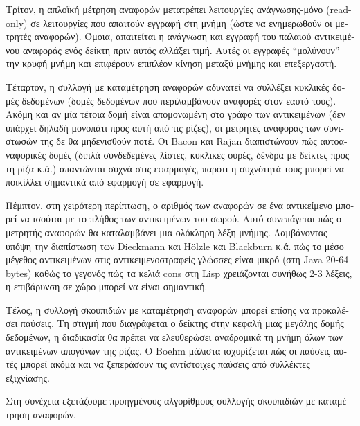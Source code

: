 \begin{greek}
Τρίτον, η απλοϊκή μέτρηση αναφορών μετατρέπει λειτουργίες
ανάγνωσης-μόνο (read-only) σε λειτουργίες που απαιτούν εγγραφή
στη μνήμη (ώστε να ενημερωθούν οι μετρητές αναφορών). Όμοια,
απαιτείται η ανάγνωση και εγγραφή του παλαιού αντικειμένου
αναφοράς ενός δείκτη πριν αυτός αλλάξει τιμή. Αυτές οι εγγραφές
``μολύνουν'' την κρυφή μνήμη και επιφέρουν επιπλέον κίνηση μεταξύ
μνήμης και επεξεργαστή.

Τέταρτον, η συλλογή με καταμέτρηση αναφορών αδυνατεί να συλλέξει
κυκλικές δομές δεδομένων (δομές δεδομένων που περιλαμβάνουν
αναφορές στον εαυτό τους). Ακόμη και αν μία τέτοια δομή είναι
απομονωμένη στο γράφο των αντικειμένων (δεν υπάρχει δηλαδή
μονοπάτι προς αυτή από τις ρίζες), οι μετρητές αναφοράς των
συνιστωσών της δε θα μηδενισθούν ποτέ. Οι Bacon και Rajan
\cite{DBLP:conf/ecoop/BaconR01} διαπιστώνουν πώς αυτοαναφορικές
δομές (διπλά συνδεδεμένες λίστες, κυκλικές ουρές, δένδρα με
δείκτες προς τη ρίζα κ.ά.) απαντώνται συχνά στις εφαρμογές,
παρότι η συχνότητά τους μπορεί να ποικίλλει σημαντικά από
εφαρμογή σε εφαρμογή.

Πέμπτον, στη χειρότερη περίπτωση, ο αριθμός των αναφορών σε
ένα αντικείμενο μπορεί να ισούται με το πλήθος των αντικειμένων
του σωρού. Αυτό συνεπάγεται πώς ο μετρητής αναφορών θα
καταλαμβάνει μια ολόκληρη λέξη μνήμης. Λαμβάνοντας υπόψη την
διαπίστωση των Dieckmann και H{\"o}lzle
\cite{DBLP:conf/ecoop/DieckmannH99} και Blackburn
κ.ά. \cite{DBLP:conf/oopsla/BlackburnGHKMBDFFGHHJLMPSVDW06}
πώς το μέσο μέγεθος αντικειμένων στις αντικειμενοστραφείς
γλώσσες είναι μικρό (στη Java 20-64 bytes) καθώς το γεγονός
πώς τα κελιά cons στη Lisp χρειάζονται συνήθως 2-3 λέξεις,
η επιβάρυνση σε χώρο μπορεί να είναι σημαντική.

Τέλος, η συλλογή σκουπιδιών με καταμέτρηση αναφορών μπορεί
επίσης να προκαλέσει παύσεις. Τη στιγμή που διαγράφεται ο
δείκτης στην κεφαλή μιας μεγάλης δομής δεδομένων, η διαδικασία 
\textenglish{} θα πρέπει να ελευθερώσει αναδρομικά
τη μνήμη όλων των αντικειμένων απογόνων της ρίζας. Ο Boehm
\cite{DBLP:conf/popl/Boehm04} μάλιστα ισχυρίζεται πώς οι
παύσεις αυτές μπορεί ακόμα και να ξεπεράσουν τις αντίστοιχες
παύσεις από συλλέκτες εξιχνίασης.

Στη συνέχεια εξετάζουμε προηγμένους αλγορίθμους συλλογής
σκουπιδιών με καταμέτρηση αναφορών.


\end{greek}
